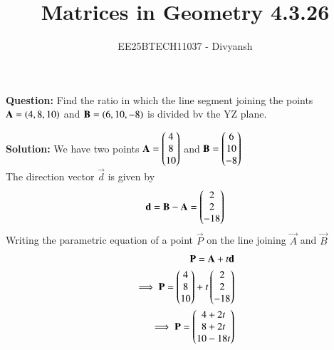 \documentclass[journal,12pt,onecolumn]{IEEEtran}
\title{Matrices in Geometry 4.3.26}
\author{EE25BTECH11037 - Divyansh}
\theoremstyle{remark}
\begin{document}
\vspace{3cm}
\maketitle
{\let\newpage\relax\maketitle}
\textbf{Question: }
Find the ratio in which the line segment joining the points $\mathbf{A}=\left(4,8,10\right)$ and $\mathbf{B}=\left(6, 10, -8\right)$ is divided bv the YZ plane.
\vspace{2mm}

\textbf{Solution:}
 \vspace{1mm}
We have two points $\mathbf{A}=\begin{pmatrix}4\\ 8 \\  10\end{pmatrix}$ and $\mathbf{B}=\begin{pmatrix}6\\  10\\ -8\end{pmatrix}$\\
The direction vector $\vec{d}$ is given by
\begin{align}
    \mathbf{d}=\mathbf{B} - \mathbf{A}=\begin{pmatrix}2 \\ 2 \\ -18\end{pmatrix}
\end{align}
Writing the parametric equation of a point $\vec{P}$ on the line joining $\vec{A}$ and $\vec{B}$
\begin{align}
    \mathbf{P} =  \mathbf{A} + t\mathbf{d}\\
    \implies \mathbf{P} = \begin{pmatrix}4 \\ 8 \\ 10\end{pmatrix} + t\begin{pmatrix}2 \\ 2 \\ -18\end{pmatrix}\\
    \implies \mathbf{P} = \begin{pmatrix}4+2t \\ 8+2t \\ 10 -18t\end{pmatrix}
\end{align}
\end{document}
